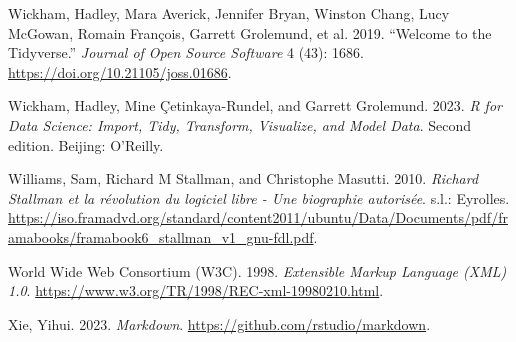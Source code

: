 \documentclass[
  letterpaper,
]{scrbook}
\newlength{\cslhangindent}
\newlength{\cslentryspacingunit} %
\newenvironment{CSLReferences}[2] %
 {%
  \setlength{\parindent}{0pt}
  \ifodd #1
  \let\oldpar\par
  \def\par{\hangindent=\cslhangindent\oldpar}
  \fi
  \setlength{\parskip}{#2\cslentryspacingunit}
 }%
 {}
\begin{document}
\begin{CSLReferences}{1}{0}
\leavevmode{}%
Wickham, Hadley, Mara Averick, Jennifer Bryan, Winston Chang, Lucy
McGowan, Romain François, Garrett Grolemund, et al. 2019. {``Welcome to
the {Tidyverse}.''} \emph{Journal of Open Source Software} 4 (43): 1686.
\url{https://doi.org/10.21105/joss.01686}.

\leavevmode{}%
Wickham, Hadley, Mine Çetinkaya-Rundel, and Garrett Grolemund. 2023.
\emph{R for Data Science: Import, Tidy, Transform, Visualize, and Model
Data}. Second edition. {Beijing}: {O'Reilly}.

\leavevmode{}%
Williams, Sam, Richard M Stallman, and Christophe Masutti. 2010.
\emph{Richard Stallman et la révolution du logiciel libre - Une
biographie autorisée}. s.l.: Eyrolles.
\url{https://iso.framadvd.org/standard/content2011/ubuntu/Data/Documents/pdf/framabooks/framabook6_stallman_v1_gnu-fdl.pdf}.

\leavevmode{}%
World Wide Web Consortium (W3C). 1998. \emph{Extensible {Markup
Language} ({XML}) 1.0}.
\url{https://www.w3.org/TR/1998/REC-xml-19980210.html}.

\leavevmode{}%
Xie, Yihui. 2023. \emph{Markdown}.
\url{https://github.com/rstudio/markdown}.

\end{CSLReferences}


\backmatter
\end{document}
